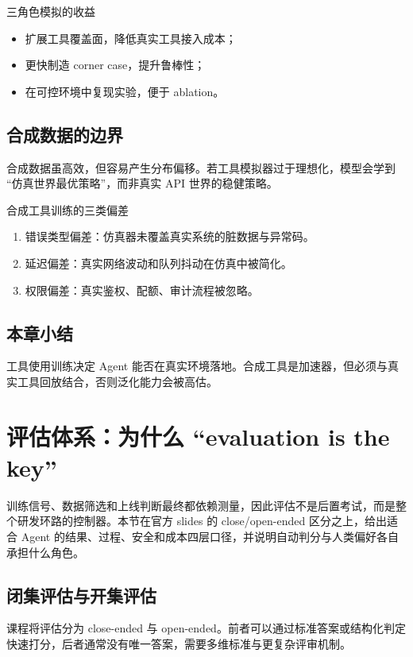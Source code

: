 \documentclass[a4paper]{article}
\begin{document}
\begin{knowledgebox}{三角色模拟的收益}
\begin{itemize}
    \item 扩展工具覆盖面，降低真实工具接入成本；
    \item 更快制造 corner case，提升鲁棒性；
    \item 在可控环境中复现实验，便于 ablation。
\end{itemize}
\end{knowledgebox}

\subsection{合成数据的边界}
合成数据虽高效，但容易产生分布偏移。若工具模拟器过于理想化，模型会学到 ``仿真世界最优策略''，而非真实 API 世界的稳健策略。

\begin{warningbox}{合成工具训练的三类偏差}
\begin{enumerate}
    \item 错误类型偏差：仿真器未覆盖真实系统的脏数据与异常码。
    \item 延迟偏差：真实网络波动和队列抖动在仿真中被简化。
    \item 权限偏差：真实鉴权、配额、审计流程被忽略。
\end{enumerate}
\end{warningbox}

\subsection{本章小结}
工具使用训练决定 Agent 能否在真实环境落地。合成工具是加速器，但必须与真实工具回放结合，否则泛化能力会被高估。


\section{评估体系：为什么 ``evaluation is the key''}

训练信号、数据筛选和上线判断最终都依赖测量，因此评估不是后置考试，而是整个研发环路的控制器。本节在官方 slides 的 close/open-ended 区分之上，给出适合 Agent 的结果、过程、安全和成本四层口径，并说明自动判分与人类偏好各自承担什么角色。

\subsection{闭集评估与开集评估}
课程将评估分为 close-ended 与 open-ended。前者可以通过标准答案或结构化判定快速打分，后者通常没有唯一答案，需要多维标准与更复杂评审机制。
\end{document}
